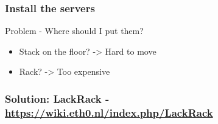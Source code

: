 \documentclass[aspectratio=169,11pt,hyperref={colorlinks=true}]{beamer}
\begin{document}
\begin{frame}
  \frametitle{Install the servers}
  Problem - Where should I put them?
  \begin{itemize}
    \item Stack on the floor? -> Hard to move
    \item Rack? -> Too expensive
  \end{itemize}
\end{frame}

\begin{frame}
  \frametitle{Solution: LackRack - \url{https://wiki.eth0.nl/index.php/LackRack}}
\end{frame}
\end{document}

